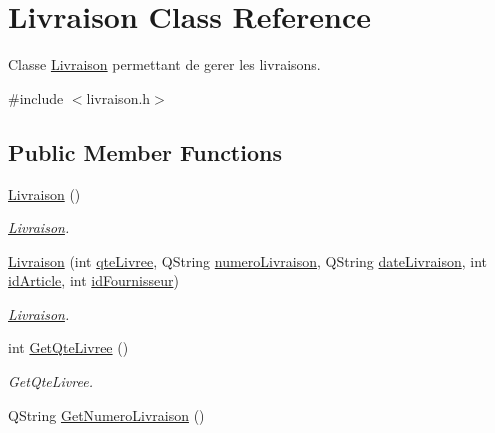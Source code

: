 \hypertarget{class_livraison}{}\section{Livraison Class Reference}
\label{class_livraison}


Classe \mbox{\hyperlink{class_livraison}{Livraison}} permettant de gerer les livraisons.  




{\ttfamily \#include $<$livraison.\+h$>$}

\subsection*{Public Member Functions}
\begin{DoxyCompactItemize}
\item 
\mbox{\label{class_livraison_a76f61baa885cb5c6648dce89cafd81f5}} 
\mbox{\hyperlink{class_livraison_a76f61baa885cb5c6648dce89cafd81f5}{Livraison}} ()
\begin{DoxyCompactList}\small\item\em \mbox{\hyperlink{class_livraison}{Livraison}}. \end{DoxyCompactList}\item 
\mbox{\hyperlink{class_livraison_a3745262b60705a9a87c5d030e619e1cb}{Livraison}} (int \mbox{\hyperlink{class_livraison_ac2ee001770c2611d4949746d93c76497}{qte\+Livree}}, Q\+String \mbox{\hyperlink{class_livraison_a6abf3db332baa359b0fb79d933147eb0}{numero\+Livraison}}, Q\+String \mbox{\hyperlink{class_livraison_ae3e31bb8f03b7191b22482deea7d769a}{date\+Livraison}}, int \mbox{\hyperlink{class_livraison_a34ff40d4ca59765bc66b57a7a4969dd2}{id\+Article}}, int \mbox{\hyperlink{class_livraison_ada2fd9015a325e8ff7ccb79d6f2a01f6}{id\+Fournisseur}})
\begin{DoxyCompactList}\small\item\em \mbox{\hyperlink{class_livraison}{Livraison}}. \end{DoxyCompactList}\item 
int \mbox{\hyperlink{class_livraison_a4995d5e50d6c62b1ab33725bae61b777}{Get\+Qte\+Livree}} ()
\begin{DoxyCompactList}\small\item\em Get\+Qte\+Livree. \end{DoxyCompactList}\item 
Q\+String \mbox{\hyperlink{class_livraison_a76aab51a1430b445d8d9802d972f5b8e}{Get\+Numero\+Livraison}} ()

\end{DoxyCompactItemize}

